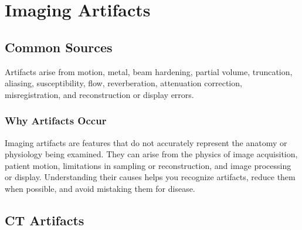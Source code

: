 \chapter{Imaging Artifacts}

\label{ch:ch32_artifacts}

\section{Common Sources}
Artifacts arise from motion, metal, beam hardening, partial volume, truncation, aliasing, susceptibility, flow, reverberation, attenuation correction, misregistration, and reconstruction or display errors.

\subsection{Why Artifacts Occur}
Imaging artifacts are features that do not accurately represent the anatomy or physiology being examined. They can arise from the physics of image acquisition, patient motion, limitations in sampling or reconstruction, and image processing or display. Understanding their causes helps you recognize artifacts, reduce them when possible, and avoid mistaking them for disease.

\section{CT Artifacts}

